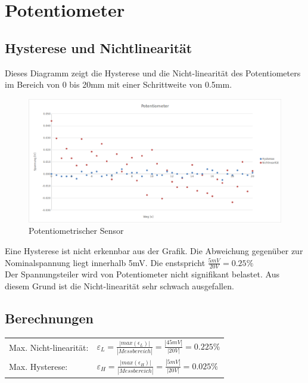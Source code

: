 \section{Potentiometer}

\subsection{Hysterese und Nichtlinearität}

Dieses Diagramm zeigt die Hysterese und die Nicht-linearität des Potentiometers im Bereich von 0 bis 20mm mit einer Schrittweite von 0.5mm.\\

\begin{figure}[H]
    \centering
    \includegraphics[scale=0.5]{pic/poti1.png}
    \caption{Potentiometrischer Sensor}
    \label{fig:poti}
\end{figure}

Eine Hysterese ist nicht erkennbar aus der Grafik. Die Abweichung gegenüber zur Nominalspannung liegt innerhalb 5mV. Die enstspricht $\frac{5mV}{20 V} = 0.25\%$\\

Der Spannungsteiler wird von Potentiometer nicht signifikant belastet. Aus diesem Grund ist die Nicht-linearität sehr schwach ausgefallen.

\subsection{Berechnungen}


\begin{tabular}{ l  l }
    Max. Nicht-linearität: & $\varepsilon_L = \frac{|max(\epsilon_L)|}{|Messbereich|}
                                            = \frac{|45mV|}{|20V|}  
                                            = 0.225\%                             $  \\
    Max. Hysterese:        & $\varepsilon_H = \frac{|max(\epsilon_H)|}{|Messbereich|}
                                            = \frac{|5mV|}{|20V|} 
                                            = 0.025\%                             $  \\
\end{tabular}


\clearpage